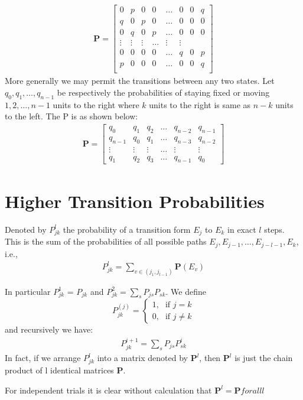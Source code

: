 \begin{example}

\begin{align}
 \mathbf{P} = \begin{bmatrix} 
    0 & p & 0 & 0 & \dots & 0 & 0 & q \\
    q & 0 & p & 0 & \dots & 0 & 0 & 0 \\
    0 & q & 0 & p & \dots & 0 & 0 & 0 \\
    \vdots & \vdots & \vdots & \dots & \vdots & \vdots\\
    0 & 0 & 0 & 0 & \dots & q & 0 & p \\
    p & 0 & 0 & 0 & \dots & 0 & 0 & q \\
    \end{bmatrix}   
\end{align}
More generally we may permit the transitions between any two states. Let $q_0, q_1, \dots, q_{n-1}$ be respectively the probabilities of staying fixed or moving $1, 2, \dots, n-1$ units to the right where $k$ units to the right is same as $n-k$ units to the left. The P is as shown below:
\begin{align}
    \mathbf{P} = \begin{bmatrix}
    q_0 & q_1 & q_2 & \dots & q_{n-2} & q_{n-1} \\
    q_{n-1} & q_0 & q_1 & \dots & q_{n-3} & q_{n-2} \\
    \vdots & \vdots & \vdots & \dots & \vdots & \vdots \\
    q_1 & q_2 & q_3 & \dots & q_{n-1} & q_0
    \end{bmatrix} 
\end{align}
\end{example}

\section{Higher Transition Probabilities}

Denoted by $P_{jk}^l$ the probability of a transition form $E_j$ to $E_k$ in exact $l$ steps. This is the sum of the probabilities of all possible paths $E_j, E_{j-1}, \dots, E_{j-{l-1}}, E_k$, i.e., 
\begin{align}
    P_{jk}^l = \sum_{v \in (j_1, j_{l-1})} \mathbf{P} {(E_v)}
\end{align}

In particular $P_{jk}^1$ = $P_{jk}$ and $P_{jk}^2 = \sum_s P_{js} P_{sk}$. 
We define \[P_{jk}^{(j)} = \begin{cases} \mbox{1,} & \mbox{if } j = k \\ \mbox{0,} & \mbox{if $j \neq k$} \end{cases} \]
and recursively we have:
\begin{align}
    P_{jk}^{i+1} = \sum_s P_{js}P_{sk}^i
\end{align}
In fact, if we arrange $P_{jk}^l$ into a matrix denoted by $\mathbf{P}^l$, then $\mathbf{P}^l$ is just the chain product of l identical matrices $\mathbf{P}$.
\begin{example}
For independent trials it is clear without calculation that $\mathbf{P}^l = \mathbf{P} for all l$
\end{example}
